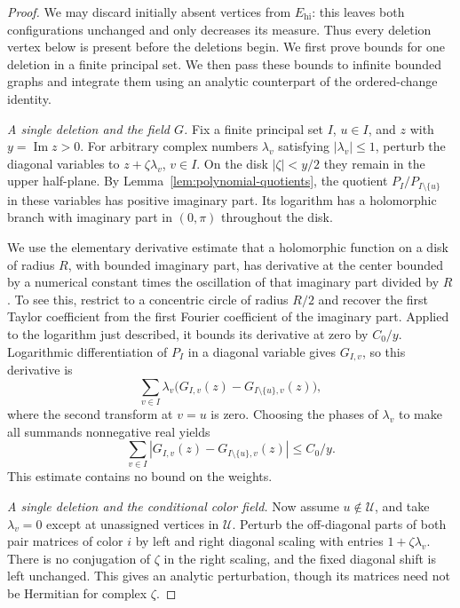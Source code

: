 \begin{proof}
We may discard initially absent vertices from $E_{\mathrm{hi}}$: this
leaves both configurations unchanged and only decreases its measure.
Thus every deletion vertex below is present before the deletions begin.
We first prove bounds for one deletion in a finite principal set.  We then
pass these bounds to infinite bounded graphs and integrate them using an
analytic counterpart of the ordered-change identity.

\emph{A single deletion and the field $G$.}
Fix a finite principal set $I$, $u\in I$, and $z$ with
$y=\operatorname{Im}z>0$.  For arbitrary complex numbers
$\lambda_v$ satisfying $|\lambda_v|\leq1$, perturb the diagonal variables
to $z+\zeta\lambda_v$, $v\in I$.  On the disk $|\zeta|<y/2$ they remain
in the upper half-plane.  By Lemma~\ref{lem:polynomial-quotients}, the
quotient $P_I/P_{I\setminus\{u\}}$ in these variables has positive
imaginary part.  Its logarithm has a holomorphic branch with imaginary
part in $(0,\pi)$ throughout the disk.

We use the elementary derivative estimate that a holomorphic function on
a disk of radius $R$, with bounded imaginary part, has derivative at the
center bounded by a numerical constant times the oscillation of that
imaginary part divided by $R$.  To see this, restrict to a concentric
circle of radius $R/2$ and recover the first Taylor coefficient from the
first Fourier coefficient of the imaginary part.  Applied to the
logarithm just described, it bounds its derivative at zero by $C_0/y$.
Logarithmic differentiation of $P_I$ in a diagonal variable gives $G_{I,v}$,
so this derivative is
\[
 \sum_{v\in I}\lambda_v
       \bigl(G_{I,v}(z)-G_{I\setminus\{u\},v}(z)\bigr),
\]
where the second transform at $v=u$ is zero.  Choosing the phases of
$\lambda_v$ to make all summands nonnegative real yields
\begin{equation}\label{inv:single-G}
 \sum_{v\in I}
  |G_{I,v}(z)-G_{I\setminus\{u\},v}(z)|\leq C_0/y.
\end{equation}
This estimate contains no bound on the weights.

\emph{A single deletion and the conditional color field.}
Now assume $u\notin\mathcal U$, and take $\lambda_v=0$ except at
unassigned vertices in $\mathcal U$.  Perturb the off-diagonal parts of
both pair matrices of color $i$ by left and right diagonal scaling with
entries $1+\zeta\lambda_v$.  There is no conjugation of $\zeta$ in the
right scaling, and the fixed diagonal shift is left unchanged.  This
gives an analytic perturbation, though its matrices need not be Hermitian
for complex $\zeta$.


\end{proof}
